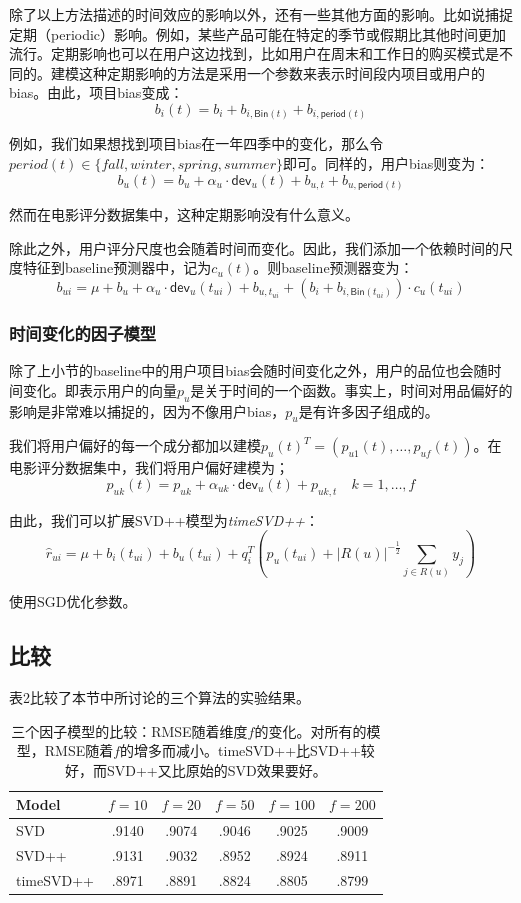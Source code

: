 \documentclass{article}
\begin{document}
 除了以上方法描述的时间效应的影响以外，还有一些其他方面的影响。比如说捕捉定期（periodic）影响。例如，某些产品可能在特定的季节或假期比其他时间更加流行。定期影响也可以在用户这边找到，比如用户在周末和工作日的购买模式是不同的。建模这种定期影响的方法是采用一个参数来表示时间段内项目或用户的bias。由此，项目bias变成：
 $$ b_i(t)=b_i+b_{i,\mathsf{Bin}(t)}+b_{i,\mathsf{period}(t)} $$

 例如，我们如果想找到项目bias在一年四季中的变化，那么令$period(t)\in\{fall,winter,spring,summer\}$即可。同样的，用户bias则变为：
 $$ b_u(t)=b_u+\alpha_u\cdot\mathsf{dev}_u(t)+b_{u,t}+b_{u,\mathsf{period}(t)} $$

 然而在电影评分数据集中，这种定期影响没有什么意义。

 除此之外，用户评分尺度也会随着时间而变化。因此，我们添加一个依赖时间的尺度特征到baseline预测器中，记为$c_u(t)$。则baseline预测器变为：
 $$ b_{ui}=\mu+b_u+\alpha_u\cdot\mathsf{dev}_u(t_{ui})+b_{u,t_{ui}}+(b_i+b_{i,\mathsf{Bin}(t_{ui})})\cdot c_u(t_{ui}) $$

 \subsubsection{时间变化的因子模型}
 除了上小节的baseline中的用户项目bias会随时间变化之外，用户的品位也会随时间变化。即表示用户的向量$p_u$是关于时间的一个函数。事实上，时间对用品偏好的影响是非常难以捕捉的，因为不像用户bias，$p_u$是有许多因子组成的。

 我们将用户偏好的每一个成分都加以建模$p_u(t)^T=(p_{u1}(t),\dots,p_{uf}(t))$。在电影评分数据集中，我们将用户偏好建模为；
 $$ p_{uk}(t)=p_{uk}+\alpha_{uk}\cdot\mathsf{dev}_u(t)+p_{uk,t}\quad k=1,\dots,f $$

 由此，我们可以扩展SVD++模型为\textit{timeSVD++}：
 $$ \hat{r}_{ui}=\mu+b_i(t_{ui})+b_u(t_{ui})+q_i^T\left(p_u(t_{ui})+|R(u)|^{-\frac{1}{2}}\mathop{\sum}\limits_{j\in R(u)}y_j\right) $$

 使用SGD优化参数。

 \subsection{比较}
 表2比较了本节中所讨论的三个算法的实验结果。

 \begin{table}[!htb]
 \centering
 \caption{三个因子模型的比较：RMSE随着维度$f$的变化。对所有的模型，RMSE随着$f$的增多而减小。timeSVD++比SVD++较好，而SVD++又比原始的SVD效果要好。}
 \begin{tabular}{|l|c|c|c|c|c|}\hline
 Model & $f=10$ & $f=20$ & $f=50$ & $f=100$ & $f=200$ \\\hline
 SVD & .9140 & .9074 & .9046 & .9025 & .9009 \\
 SVD++ & .9131 & .9032 & .8952 & .8924 & .8911 \\
 timeSVD++ & .8971 & .8891 & .8824 & .8805 & .8799 \\\hline
 \end{tabular}
 \end{table}
\end{document}
